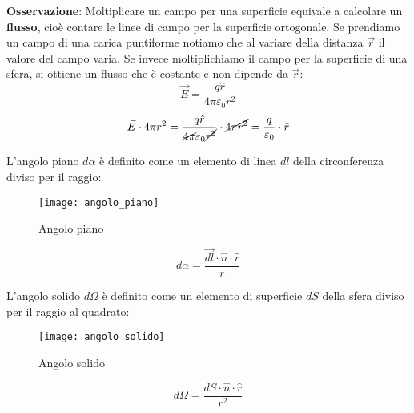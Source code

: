 \documentclass[a4paper]{article}
\begin{document}
\vspace{1em}
\noindent
\textbf{Osservazione}: Moltiplicare un campo per una superficie equivale a calcolare un
\textbf{flusso}, cioè contare le linee di campo per la superficie ortogonale. Se prendiamo
un campo di una carica puntiforme notiamo che al variare della distanza \( \vec{r} \) 
il valore del campo varia. Se invece moltiplichiamo il campo per la superficie di una 
sfera, si ottiene un flusso che è costante e non dipende da \( \vec{r} \):
\[
  \vec{E} = \frac{q \hat{r}}{4 \pi \varepsilon_0 r^2}
\] 
\[
  \vec{E} \cdot 4 \pi r^2 = \frac{q \hat{r}}{\cancel{4 \pi} \varepsilon_0 \cancel{r^2}}
  \cdot \cancel{4 \pi r^2} = \frac{q}{\varepsilon_0} \cdot \hat{r}
\] 

\begin{define}
  L'angolo piano \( d \alpha \) è definito come un elemento di linea \( dl \) della
  circonferenza diviso per il raggio:
  \begin{figure}[H]
    \centering
    \texttt{[image: angolo\_piano]}
    \caption{Angolo piano}
  \end{figure}
  \[
    d \alpha = \frac{\vec{dl} \cdot \hat{n} \cdot \hat{r}}{r}
  \] 
\end{define}
\begin{define}
  L'angolo solido \( d \Omega \) è definito come un elemento di superficie \( dS \) della
  sfera diviso per il raggio al quadrato:
  \begin{figure}[H]
    \centering
    \texttt{[image: angolo\_solido]}
    \caption{Angolo solido}
  \end{figure}
  \[
    d \Omega = \frac{dS \cdot \hat{n} \cdot \hat{r}}{r^2}
  \]
  
\end{define}
\end{document}
